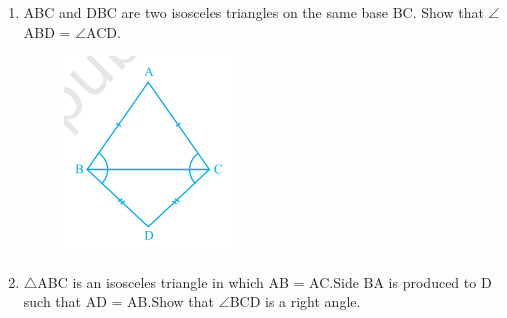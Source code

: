 \documentclass[12pt]{article}
\begin{document}
\begin{enumerate}
\begin{figure}[!h]
\begin{center}
\end{center}                                      \caption{}                                        \label{fig:Fig1}                                  \end{figure}
\item ABC and DBC are two isosceles triangles on the same base BC. Show that
$\angle$ABD = $\angle$ACD.
\begin{figure}[!h]
\begin{center}
\includegraphics[width=\columnwidth]{./figs/triangle6.png}
\end{center}                                      \caption{}                                        \label{fig:Fig1}                                  \end{figure}
\item$\triangle$ABC is an isosceles triangle in which AB = AC.Side BA is produced to D such that AD = AB.Show that $\angle$BCD is a right angle.
	\begin{figure}[!h]
\begin{center}

\end{center}
\end{figure}
\end{enumerate}
\end{document}
